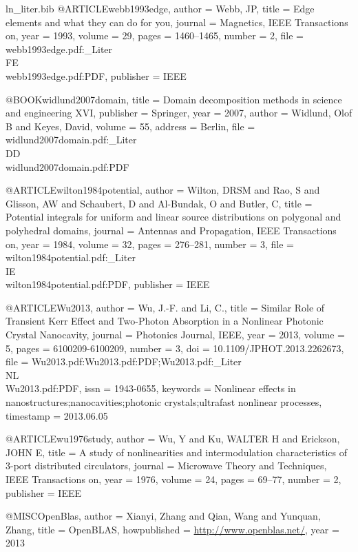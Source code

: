 \begin{filecontents*}{ln_liter.bib}
@ARTICLE{webb1993edge,
  author = {Webb, JP},
  title = {Edge elements and what they can do for you},
  journal = {Magnetics, IEEE Transactions on},
  year = {1993},
  volume = {29},
  pages = {1460--1465},
  number = {2},
  file = {webb1993edge.pdf:_Liter\\FE\\webb1993edge.pdf:PDF},
  publisher = {IEEE}
}

@BOOK{widlund2007domain,
  title = {Domain decomposition methods in science and engineering XVI},
  publisher = {Springer},
  year = {2007},
  author = {Widlund, Olof B and Keyes, David},
  volume = {55},
  address = {Berlin},
  file = {widlund2007domain.pdf:_Liter\\DD\\widlund2007domain.pdf:PDF}
}

@ARTICLE{wilton1984potential,
  author = {Wilton, DRSM and Rao, S and Glisson, AW and Schaubert, D and Al-Bundak,
	O and Butler, C},
  title = {Potential integrals for uniform and linear source distributions on
	polygonal and polyhedral domains},
  journal = {Antennas and Propagation, IEEE Transactions on},
  year = {1984},
  volume = {32},
  pages = {276--281},
  number = {3},
  file = {wilton1984potential.pdf:_Liter\\IE\\wilton1984potential.pdf:PDF},
  publisher = {IEEE}
}

@ARTICLE{Wu2013,
  author = {Wu, J.-F. and Li, C.},
  title = {Similar Role of Transient Kerr Effect and Two-Photon Absorption in
	a Nonlinear Photonic Crystal Nanocavity},
  journal = {Photonics Journal, IEEE},
  year = {2013},
  volume = {5},
  pages = {6100209-6100209},
  number = {3},
  doi = {10.1109/JPHOT.2013.2262673},
  file = {Wu2013.pdf:Wu2013.pdf:PDF;Wu2013.pdf:_Liter\\NL\\Wu2013.pdf:PDF},
  issn = {1943-0655},
  keywords = {Nonlinear effects in nanostructures;nanocavities;photonic crystals;ultrafast
	nonlinear processes},
  timestamp = {2013.06.05}
}

@ARTICLE{wu1976study,
  author = {Wu, Y and Ku, WALTER H and Erickson, JOHN E},
  title = {A study of nonlinearities and intermodulation characteristics of
	3-port distributed circulators},
  journal = {Microwave Theory and Techniques, IEEE Transactions on},
  year = {1976},
  volume = {24},
  pages = {69--77},
  number = {2},
  publisher = {IEEE}
}

@MISC{OpenBlas,
  author = {Xianyi, Zhang and Qian, Wang and Yunquan, Zhang},
  title = {OpenBLAS},
  howpublished = {\url{http://www.openblas.net/}},
  year = {2013}
}


\end{filecontents*}
